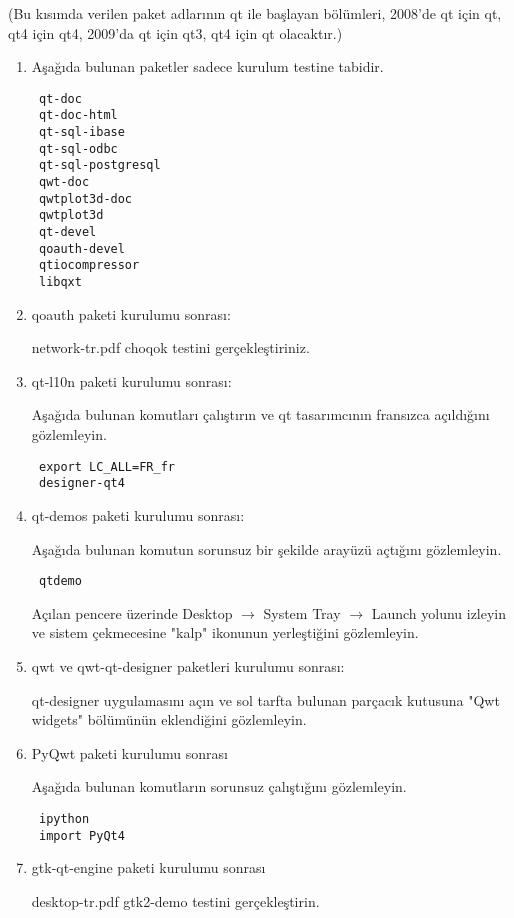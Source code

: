 \documentclass[a4paper,10pt]{article}
\begin{document}
(Bu kısımda verilen paket adlarının qt ile başlayan bölümleri, 2008'de qt için qt, qt4 için qt4, 2009'da qt için qt3, qt4 için qt olacaktır.)
\begin{enumerate}
 \item Aşağıda bulunan paketler sadece kurulum testine tabidir.
\begin{verbatim}
 qt-doc
 qt-doc-html
 qt-sql-ibase
 qt-sql-odbc
 qt-sql-postgresql
 qwt-doc
 qwtplot3d-doc
 qwtplot3d
 qt-devel
 qoauth-devel
 qtiocompressor
 libqxt
\end{verbatim}

\item qoauth paketi kurulumu sonrası:

network-tr.pdf choqok testini gerçekleştiriniz.

\item qt-l10n paketi kurulumu sonrası:

Aşağıda bulunan komutları çalıştırın ve qt tasarımcının fransızca açıldığını gözlemleyin.
\begin{verbatim}
 export LC_ALL=FR_fr
 designer-qt4
\end{verbatim}

\item  qt-demos paketi kurulumu sonrası:

Aşağıda bulunan komutun sorunsuz bir şekilde arayüzü açtığını gözlemleyin.
\begin{verbatim}
 qtdemo
\end{verbatim}

Açılan pencere üzerinde Desktop $\rightarrow$ System Tray $\rightarrow$ Launch yolunu izleyin ve sistem çekmecesine "kalp" ikonunun yerleştiğini gözlemleyin.

\item qwt ve qwt-qt-designer paketleri kurulumu sonrası:

qt-designer uygulamasını açın ve sol tarfta bulunan parçacık kutusuna "Qwt widgets" bölümünün eklendiğini gözlemleyin.

\item PyQwt paketi kurulumu sonrası

Aşağıda bulunan komutların sorunsuz çalıştığını gözlemleyin.
\begin{verbatim}
 ipython
 import PyQt4
\end{verbatim}


\item gtk-qt-engine paketi kurulumu sonrası

desktop-tr.pdf gtk2-demo testini gerçekleştirin.


\end{enumerate}
\end{document}
